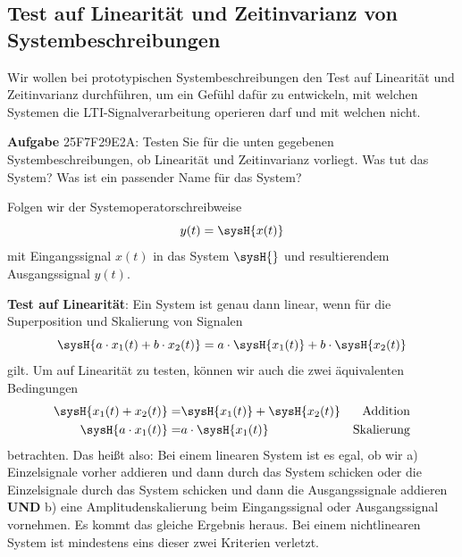\clearpage
\subsection{Test auf Linearität und Zeitinvarianz von Systembeschreibungen}
\label{sec:25F7F29E2A}
\begin{Ziel}
Wir wollen bei prototypischen Systembeschreibungen den Test auf
Linearität und Zeitinvarianz durchführen, um ein Gefühl dafür zu entwickeln,
mit welchen Systemen die LTI-Signalverarbeitung operieren darf und mit welchen nicht.
\end{Ziel}
\textbf{Aufgabe} {\tiny 25F7F29E2A}: Testen Sie für die unten gegebenen
Systembeschreibungen, ob Linearität und Zeitinvarianz vorliegt.
Was tut das System? Was ist ein passender Name für das System?
\begin{Werkzeug}
Folgen wir der Systemoperatorschreibweise
\begin{equation}
y(t) = \sysH{x(t)}
\end{equation}
mit Eingangssignal $x(t)$ in das System $\sysH{}$ und resultierendem
Ausgangssignal $y(t)$.

\textbf{Test auf Linearität}:
%
Ein System ist genau dann linear, wenn für die Superposition und Skalierung
von Signalen
\begin{equation}
\sysH{a\cdot x_1(t) + b\cdot x_2(t)} = a\cdot\sysH{x_1(t)} + b\cdot\sysH{x_2(t)}
\end{equation}
gilt.
Um auf Linearität zu testen, können wir auch die zwei äquivalenten Bedingungen
\begin{align}
\sysH{x_1(t) + x_2(t)} =& \sysH{x_1(t)} + \sysH{x_2(t)} &\text{Addition}\\
\sysH{a \cdot x_1(t)} =& a \cdot \sysH{x_1(t)} &\text{Skalierung}
\end{align}
betrachten.
Das heißt also: Bei einem linearen System ist es egal, ob wir a) Einzelsignale
vorher addieren und dann durch das System schicken oder die Einzelsignale durch das
System schicken und dann die Ausgangssignale addieren \textbf{UND} b)
eine Amplitudenskalierung beim Eingangssignal oder Ausgangssignal vornehmen. Es kommt
das gleiche Ergebnis heraus. Bei einem nichtlinearen System ist mindestens eins dieser
zwei Kriterien verletzt.


\end{Werkzeug}

